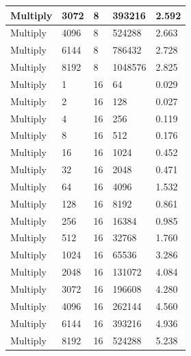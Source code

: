 \documentclass{article}
\begin{document}
\begin{longtable}{|l|l|l|l|l|}
Multiply           & 3072 & 8           & 393216            & 2.592             \\ \hline
Multiply           & 4096 & 8           & 524288            & 2.663             \\ \hline
Multiply           & 6144 & 8           & 786432            & 2.728             \\ \hline
Multiply           & 8192 & 8           & 1048576           & 2.825             \\ \hline
Multiply           & 1    & 16          & 64                & 0.029             \\ \hline
Multiply           & 2    & 16          & 128               & 0.027             \\ \hline
Multiply           & 4    & 16          & 256               & 0.119             \\ \hline
Multiply           & 8    & 16          & 512               & 0.176             \\ \hline
Multiply           & 16   & 16          & 1024              & 0.452             \\ \hline
Multiply           & 32   & 16          & 2048              & 0.471             \\ \hline
Multiply           & 64   & 16          & 4096              & 1.532             \\ \hline
Multiply           & 128  & 16          & 8192              & 0.861             \\ \hline
Multiply           & 256  & 16          & 16384             & 0.985             \\ \hline
Multiply           & 512  & 16          & 32768             & 1.760             \\ \hline
Multiply           & 1024 & 16          & 65536             & 3.286             \\ \hline
Multiply           & 2048 & 16          & 131072            & 4.084             \\ \hline
Multiply           & 3072 & 16          & 196608            & 4.280             \\ \hline
Multiply           & 4096 & 16          & 262144            & 4.560             \\ \hline
Multiply           & 6144 & 16          & 393216            & 4.936             \\ \hline
Multiply           & 8192 & 16          & 524288            & 5.238             \\ \hline

\end{longtable}
\end{document}
